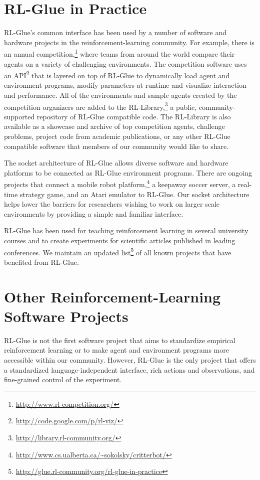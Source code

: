 \documentclass[twoside,11pt]{article}
\begin{document}
\section{RL-Glue in Practice}
\vspace{-0.2cm}
RL-Glue's common interface has been used by a number of software and hardware projects in the reinforcement-learning community.  For example, there is an annual competition,\footnote{\url{http://www.rl-competition.org/}} where teams from around the world compare their agents on a variety of challenging environments.  The competition software uses an API\footnote{\url{http://code.google.com/p/rl-viz/}} that is layered on top of RL-Glue to dynamically load agent and environment programs, modify parameters at runtime and visualize interaction and performance.  All of the environments and sample agents created by the competition organizers are added to the RL-Library,\footnote{\url{http://library.rl-community.org/}} a public, community-supported repository of RL-Glue compatible code. The RL-Library is also available as a showcase and archive of top competition agents, challenge problems, project code from academic publications, or any other RL-Glue compatible software that members of our community would like to share.


The socket architecture of RL-Glue allows diverse software and hardware platforms to be connected as RL-Glue environment programs.  There are ongoing projects that connect a mobile robot platform,\footnote{\url{http://www.cs.ualberta.ca/~sokolsky/critterbot/}} a  keepaway soccer server, a real-time strategy game, and an Atari emulator to RL-Glue. Our socket architecture helps lower the barriers for researchers wishing to work on larger scale environments by providing a simple and familiar interface. %

RL-Glue has been used for teaching reinforcement learning in several university courses and to create experiments for scientific articles published in leading conferences. We maintain an updated list\footnote{\url{http://glue.rl-community.org/rl-glue-in-practice}} of all known projects that have benefited from RL-Glue.



\vspace{-0.2cm}
\section{Other Reinforcement-Learning Software Projects}
\vspace{-0.2cm}
RL-Glue is not the first software project that aims to  standardize empirical reinforcement learning or to make agent and environment programs more accessible within our community.  However, RL-Glue is the only project that offers a standardized language-independent interface, rich actions and observations, and fine-grained control of the experiment.
\end{document}
